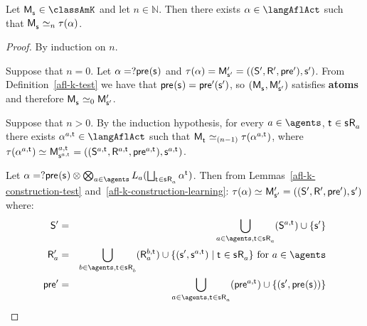 \begin{proposition}\label{afl-k-correspondence}
    Let $\aPModel{\aStateS} \in \classAmK$ and let $n \in \mathbb{N}$. 
    Then there exists $\alpha \in \langAflAct$ such that $\aPModel{\aStateS} \bisimilar[n] \tau(\alpha)$.
\end{proposition}

\begin{proof}
    By induction on $n$.

    Suppose that $n = 0$.
    Let $\alpha = \test{\aPrecondition(\aStateS)}$ and $\tau(\alpha) = \aPModel[\prime]{\aStateS[\prime]} = \aPModelTuple[\prime]{\aStateS[\prime]}$.
    From Definition~\ref{afl-k-test} we have that $\aPrecondition(\aStateS) = \aPrecondition[\prime](\aStateS[\prime])$, so $(\aPModel{\aStateS}, \aPModel[\prime]{\aStateS[\prime]})$ satisfies {\bf atoms} and therefore $\aPModel{\aStateS} \bisimilar[0] \aPModel[\prime]{\aStateS[\prime]}$.

    Suppose that $n > 0$. 
    By the induction hypothesis, for every $\agentA \in \agents$, $\aStateT \in \aStateS \aAccessibility{\agentA}$ there exists $\alpha^{\agentA,\aStateT} \in \langAflAct$ such that $\aPModel{\aStateT} \bisimilar[(n - 1)] \tau(\alpha^{\agentA,\aStateT})$, where $\tau(\alpha^{\agentA,\aStateT}) \bisimilar \aPModel[\agentA,\aStateT]{\aStateS[\agentA,\aStateT]} = \aPModelTuple[\agentA,\aStateT]{\aStateS[\agentA,\aStateT]}$.
    
    Let $\alpha = \test{\aPrecondition(\aStateS)} \compose \bigcompose_{\agentA \in \agents} \learns_\agentA (\bigchoice_{\aStateT \in \aStateS \aAccessibility{\agentA}} \alpha^{\aStateT})$. 
    Then from Lemmas~\ref{afl-k-construction-test} and~\ref{afl-k-construction-learning}: $\tau(\alpha) \bisimilar \aPModel[\prime]{\aStateS[\prime]} = \aPModelTuple[\prime]{\aStateS[\prime]}$ where:
    \begin{eqnarray*}
        \aStates[\prime] &=& \bigcup_{\agentA \in \agents, \aStateT \in \aStateS \aAccessibility{\agentA}} (\aStates[\agentA,\aStateT]) \cup \{\aStateS[\prime]\}\\
        \aAccessibility[\prime]{\agentA} &=& \bigcup_{\agentB \in \agents, \aStateT \in \aStateS \aAccessibility{\agentB}} (\aAccessibility[\agentB,\aStateT]{\agentA}) \cup \{(\aStateS[\prime], \aStateS[\agentA,\aStateT]) \mid \aStateT \in \aStateS \aAccessibility{\agentA}\} \text{ for } \agentA \in \agents\\
        \aPrecondition[\prime] &=& \bigcup_{\agentA \in \agents, \aStateT \in \aStateS \aAccessibility{\agentA}} (\aPrecondition[\agentA,\aStateT]) \cup \{(\aStateS[\prime], \aPrecondition(\aStateS))\}
    \end{eqnarray*}


\end{proof}
